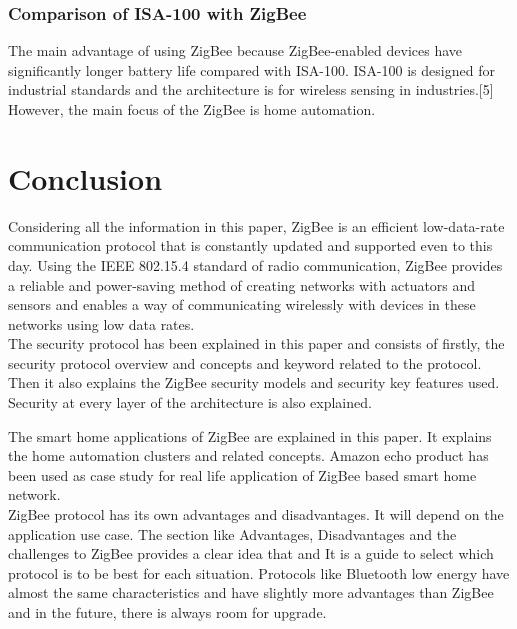 \documentclass[conference]{IEEEtran}
\begin{document}
\subsubsection{Comparison of ISA-100 with ZigBee} 
The main advantage of using ZigBee because ZigBee-enabled devices have significantly longer battery life compared with ISA-100. ISA-100 is designed for industrial standards and the architecture is for wireless sensing in industries.[5] However, the main focus of the ZigBee is home automation.  

\section{Conclusion}

Considering all the information in this paper, ZigBee is an efficient low-data-rate communication protocol that is constantly updated and supported even to this day. Using the IEEE 802.15.4 standard of radio communication, ZigBee provides a reliable and power-saving method of creating networks with actuators and sensors and enables a way of communicating wirelessly with devices in these networks using low data rates.\\

The security protocol has been explained in this paper and consists of firstly, the security protocol overview and concepts and keyword related to the protocol. Then it also explains the ZigBee security models and security key features used. Security at every layer of the architecture is also explained.

The smart home applications of ZigBee are explained in this paper.
It explains the home automation clusters and related concepts. Amazon echo product has been used as case study for real life application of ZigBee based smart home network. \\
ZigBee protocol has its own advantages and disadvantages. It will depend on the application use case. The section like Advantages, Disadvantages and the challenges to ZigBee provides a clear idea that and It is a guide to select which protocol is to be best for each situation. Protocols like Bluetooth low energy have almost the same characteristics and have slightly more advantages than ZigBee and in the future, there is always room for upgrade. 
\end{document}
